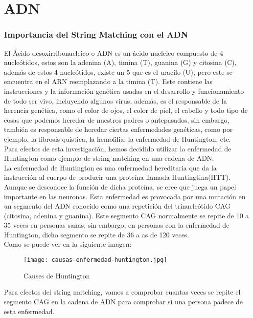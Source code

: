 \part*{ADN}%

\section*{Importancia del String Matching con el ADN}

\quad El Ácido desoxirribonucleico o ADN es un ácido nucleico compuesto de 4 nucleótidos, estos son la adenina (A), timina (T), guanina (G) y citosina (C), además de estos 4 nucleótidos, existe un 5 que es el uracilo (U), pero este se encuentra en el ARN reemplazando a la timina (T). Este contiene las instrucciones y la información genética usadas en el desarrollo y funcionamiento de todo ser vivo, incluyendo algunos virus, además, es el responsable de la herencia genética, como el color de ojos, el color de piel, el cabello y todo tipo de cosas que podemos heredar de nuestros padres o antepasados, sin embargo, también es responsable de heredar ciertas enfermedades genéticas, como por ejemplo, la fibrosis quística, la hemofilia, la enfermedad de Huntington, etc. \\

\quad Para efectos de esta investigación, hemos decidido utilizar la enfermedad de Huntington como ejemplo de string matching en una cadena de ADN. \\

\quad La enfermedad de Huntington es una enfermedad hereditaria que da la instrucción al cuerpo de producir una proteína llamada Huntingtina(HTT). Aunque se desconoce la función de dicha proteína, se cree que juega un papel importante en las neuronas. Esta enfermedad es provocada por una mutación en un segmento del ADN conocido como una repetición del trinucleótido CAG (citosina, adenina y guanina). Este segmento CAG normalmente se repite de 10 a 35 veces en personas sanas, sin embargo, en personas con la enfermedad de Huntington, dicho segmento se repite de 36 a as de 120 veces. \\

Como se puede ver en la siguiente imagen: 
\begin{figure} [H]
\texttt{[image: causas-enfermedad-huntington.jpg]}
\caption{Causes de Huntington}
\label{fig:Hunttington}
\end{figure}


\quad Para efectos del string matching, vamos a comprobar cuantas veces se repite  el segmento CAG en la cadena de ADN para comprobar si una persona padece de esta enfermedad.

